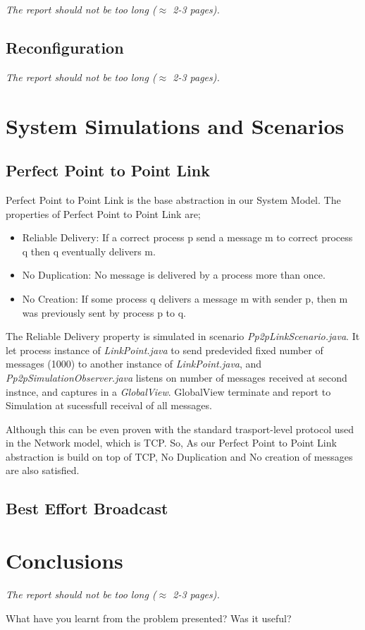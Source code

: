 \documentclass[a4paper, 11pt]{article}
\begin{document}
\textit{The report should not be too long ($\approx$
	2-3 pages).}

\subsection{Reconfiguration}
\textit{The report should not be too long ($\approx$
	2-3 pages).}

\section{System Simulations and Scenarios}

\subsection{Perfect Point to Point Link}
Perfect Point to Point Link is the base abstraction in our System Model. The properties of Perfect Point to Point Link are;
 
\begin{itemize}
	\item Reliable Delivery: If a correct process p send a message m to correct process q then q eventually delivers m.
	
	\item No Duplication: No message is delivered by a process more than once.
	
	\item No Creation: If some process q delivers a message m with sender p, then m was previously sent by process p to q.

\end{itemize}

The Reliable Delivery property is simulated in scenario \textit{Pp2pLinkScenario.java}. It let process instance of \textit{LinkPoint.java} to send predevided fixed number of messages (1000) to another instance of \textit{LinkPoint.java}, and \textit{Pp2pSimulationObserver.java} listens on number of messages received at second instnce, and captures in a 
\textit{GlobalView}. GlobalView terminate and report to Simulation at sucessfull receival of all messages.

Although this can be even proven with the standard trasport-level protocol used in the Network model, which is TCP. 
So, As our Perfect Point to Point Link abstraction is build on top of TCP, No Duplication and No creation of messages are also satisfied.

\subsection{Best Effort Broadcast}

\section{Conclusions}

\textit{The report should not be too long ($\approx$
  2-3 pages).}

What have you learnt from the problem presented?
Was it useful?
\end{document}
